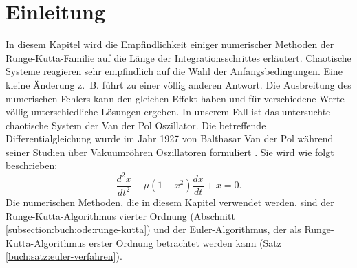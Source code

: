 %
%
%
\section{Einleitung\label{vanderpol:section:einleitung}}
In diesem Kapitel wird die Empfindlichkeit einiger numerischer Methoden der Runge-Kutta-Familie auf die Länge der Integrationsschrittes erläutert.
%
%
Chaotische Systeme reagieren sehr empfindlich auf die Wahl der Anfangsbedingungen. Eine kleine Änderung z.~B. führt zu einer völlig anderen Antwort.
Die Ausbreitung des numerischen Fehlers kann den gleichen Effekt haben und für verschiedene Werte völlig unterschiedliche Lösungen ergeben.
In unserem Fall ist das untersuchte chaotische System der Van der Pol Oszillator.
%
%
Die betreffende Differentialgleichung wurde im Jahr 1927 von Balthasar Van der Pol während seiner Studien über Vakuumröhren Oszillatoren formuliert \cite{vanderpol:bibvdp}.
%
%
Sie wird wie folgt beschrieben:
\begin{equation}
\frac{d^{2}x}{dt^{2}} - \mu (1 - x^{2}) \frac{dx}{dt} + x = 0.
\label{vanderpol:equations:vdp}
\end{equation}
Die numerischen Methoden, die in diesem Kapitel verwendet werden, sind der Runge-Kutta-Algo\-rith\-mus vierter Ordnung (Abschnitt \ref{subsection:buch:ode:runge-kutta}) und der Euler-Algorithmus, der als Runge-Kutta-Algo\-rith\-mus erster Ordnung betrachtet werden kann (Satz \ref{buch:satz:euler-verfahren}).
%
